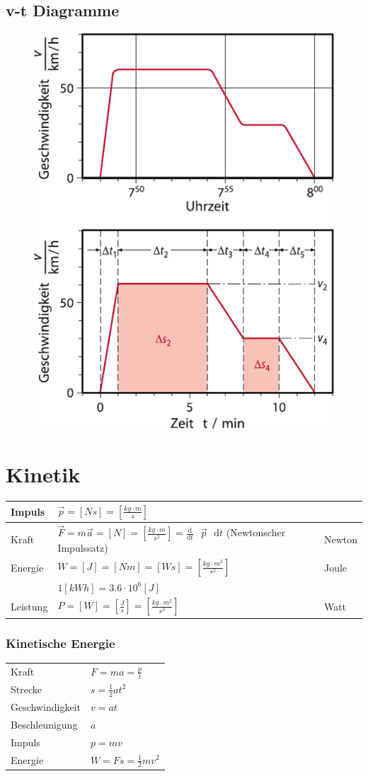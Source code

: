 \documentclass[a4paper]{scrartcl}
\newcommand{\abl}[2]{\frac{\text{d}}{\text{d}#2}\text{ } #1 \text{ }\mathrm{d}t}
\begin{document}
\subsection{v-t Diagramme}
	
	\begin{figure}[h!]
		\includegraphics[width=0.4\linewidth]{img/v-t_diagram}
		\caption{}
		\label{fig:v-tdiagram}
	\end{figure}



\section{Kinetik}
	\begin{tabu} {l X l}
		\hline
		Impuls
		&	$\vec{p} = \left[ Ns \right] = \left[ \frac{kg \cdot m}{s} \right]$	%
		& 
		\\ \hline
		Kraft
		&	$\vec{F}=m\vec{a} = \left[ N \right] = \left[ \frac{kg \cdot m}{s^2} \right] = \abl{\vec{p}}{t}$ (Newtonscher Impulssatz) %
		&	Newton
		\\ \hline
		Energie
		&	$W = \left[ J \right] = \left[ N m \right] = \left[ Ws \right] = \left[ \frac{kg \cdot m^2}{s^2} \right]$
		&	Joule
		\\
		&	$1 \left[kWh\right] = 3.6 \cdot 10^6 \left[ J \right]$
		&
		\\ \hline
		Leistung
		&	$P = \left[ W \right] = \left[ \frac{J}{s} \right] = \left[ \frac{kg \cdot m^2}{s^3} \right]$
		&	Watt
		\\ \hline
	\end{tabu}
	
\subsubsection{Kinetische Energie}
	\begin{tabu} {l X}
		Kraft & $F = ma = \frac{p}{t}$ \\
		Strecke & $s = \frac{1}{2} a t^2$ \\
		Geschwindigkeit & $v = at$ \\
		Beschleunigung & $a$\\
		Impuls & $p = mv$ \\
		Energie & $W = Fs = \frac{1}{2} mv^2$
	\end{tabu}
			
\end{document}
